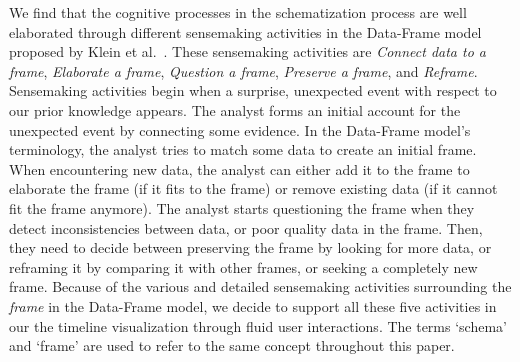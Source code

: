 We find that the cognitive processes in the schematization process are well elaborated through different sensemaking activities in the Data-Frame model proposed by Klein et al.~\cite{Klein2003}. These sensemaking activities are \emph{Connect data to a frame}, \emph{Elaborate a frame}, \emph{Question a frame}, \emph{Preserve a frame}, and \emph{Reframe}. Sensemaking activities begin when a surprise, unexpected event with respect to our prior knowledge appears. The analyst forms an initial account for the unexpected event by connecting some evidence. In the Data-Frame model's terminology, the analyst tries to match some data to create an initial frame. When encountering new data, the analyst can either add it to the frame to elaborate the frame (if it fits to the frame) or remove existing data (if it cannot fit the frame anymore). The analyst starts questioning the frame when they detect inconsistencies between data, or poor quality data in the frame. Then, they need to decide between preserving the frame by looking for more data, or reframing it by comparing it with other frames, or seeking a completely new frame. Because of the various and detailed sensemaking activities surrounding the \textit{frame} in the Data-Frame model, we decide to support all these five activities in our the timeline visualization through fluid user interactions. The terms `schema' and `frame' are used to refer to the same concept throughout this paper.

%

